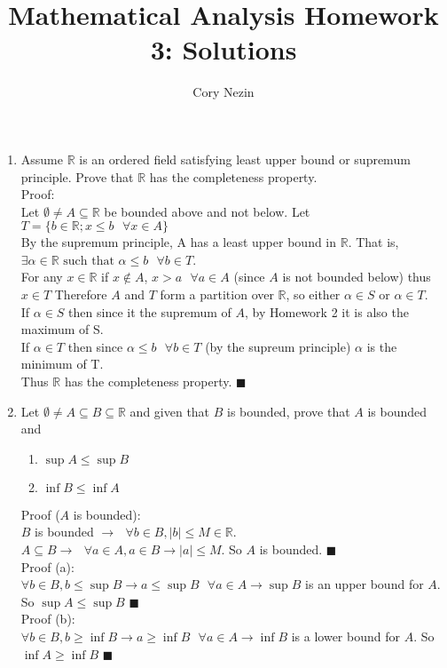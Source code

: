 \documentclass[12pt]{article}
\title{Mathematical Analysis Homework 3: Solutions}
\author{Cory Nezin}
\begin{document}
\maketitle
\begin{enumerate}
\item Assume $\mathbb{R}$ is an ordered field satisfying least upper bound or supremum principle.  Prove that $\mathbb{R}$ has the completeness property.\\

Proof:\\
Let $\emptyset \neq A\subseteq \mathbb{R}$ be bounded above and not below. Let $T = \{b \in \mathbb{R}; x \leq b \text{ }\forall x \in A\}$\\
By the supremum principle, A has a least upper bound in $\mathbb{R}$.  That is, $\exists \alpha \in \mathbb{R} \text{ such that } \alpha \leq b \text{ } \forall b\in T$.\\

For any $x\in \mathbb{R}$ if $x\notin A$, $x>a\text{ }\forall a\in A$ (since $A$ is not bounded below) thus $x\in T$ Therefore $A$ and $T$ form a partition over $\mathbb{R}$, so either $\alpha \in S$ or $\alpha \in T$.\\

If $\alpha \in S$ then since it the supremum of $A$, by Homework 2 it is also the maximum of S.\\
If $\alpha \in T$ then since $\alpha \leq b \text{ } \forall b \in T$ (by the supreum principle)  $\alpha$ is the minimum of T.\\
Thus $\mathbb{R}$ has the completeness property. $\blacksquare$

\item Let $\emptyset \neq A \subseteq B \subseteq \mathbb{R}$ and given that $B$ is bounded, prove that $A$ is bounded and
\begin{enumerate}
\item $\sup A \leq \sup B$
\item $\inf B \leq \inf A$
\end{enumerate}
Proof ($A$ is bounded):\\
$B$ is bounded $\rightarrow \text{ } \forall b\in B, |b| \leq M \in \mathbb{R}$.\\
$A \subseteq B \rightarrow \text{ } \forall a\in A, a\in B \rightarrow |a| \leq M$.  So $A$ is bounded. $\blacksquare$\\

Proof (a):\\
$\forall b\in B, b \leq \sup B \rightarrow a \leq \sup B \text{ } \forall a\in A \rightarrow \sup B$ is an upper bound for $A$.  So $\sup A \leq \sup B$ $\blacksquare$\\
Proof (b):\\
$\forall b\in B, b \geq \inf B \rightarrow a \geq \inf B \text{ } \forall a\in A \rightarrow \inf B$ is a lower bound for $A$.  So $\inf A \geq \inf B$ $\blacksquare$
\end{enumerate}
\end{document}
